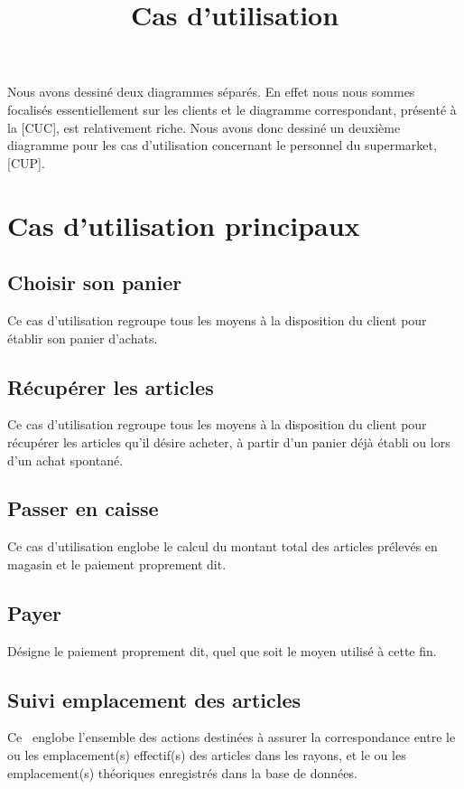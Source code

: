 \title{Cas d'utilisation}
Nous avons dessiné deux diagrammes séparés.
En effet nous nous sommes focalisés essentiellement sur les clients et le diagramme correspondant, présenté à la [CUC], est relativement riche.
Nous avons donc dessiné un deuxième diagramme pour les cas d'utilisation concernant le personnel du supermarket, [CUP].

\section{Cas d'utilisation principaux}

\subsection{Choisir son panier}
Ce cas d'utilisation regroupe tous les moyens à la disposition du client pour établir son panier d'achats.

\subsection{Récupérer les articles}
Ce cas d'utilisation regroupe tous les moyens à la disposition du client pour récupérer les articles qu'il désire acheter, à partir d'un panier déjà établi ou lors d'un achat spontané.

\subsection{Passer en caisse}
Ce cas d'utilisation englobe le calcul du montant total des articles prélevés en magasin et le paiement proprement dit.

\subsection{Payer}
Désigne le paiement proprement dit, quel que soit le moyen utilisé à cette fin.

\subsection{Suivi emplacement des articles}
Ce \cu\ englobe l'ensemble des actions destinées à assurer la correspondance entre le ou les emplacement(s) effectif(s) des articles dans les rayons, et le ou les emplacement(s) théoriques enregistrés dans la base de données.

